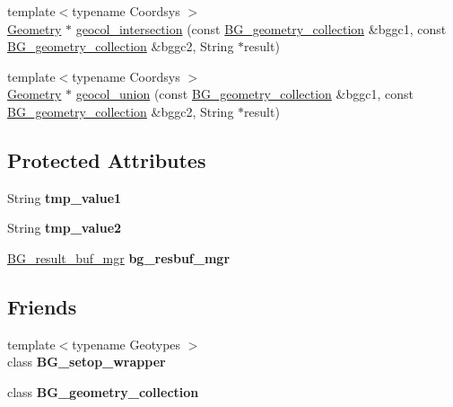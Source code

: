 \begin{DoxyCompactItemize}
\item 
{\footnotesize template$<$typename Coordsys $>$ }\\\mbox{\hyperlink{classGeometry}{Geometry}} $\ast$ \mbox{\hyperlink{classItem__func__spatial__operation_abf688dc5305ee501e952523d5131207d}{geocol\+\_\+intersection}} (const \mbox{\hyperlink{classBG__geometry__collection}{B\+G\+\_\+geometry\+\_\+collection}} \&bggc1, const \mbox{\hyperlink{classBG__geometry__collection}{B\+G\+\_\+geometry\+\_\+collection}} \&bggc2, String $\ast$result)
\item 
{\footnotesize template$<$typename Coordsys $>$ }\\\mbox{\hyperlink{classGeometry}{Geometry}} $\ast$ \mbox{\hyperlink{classItem__func__spatial__operation_a9827ef61e810b39f28574cc670bfb7b3}{geocol\+\_\+union}} (const \mbox{\hyperlink{classBG__geometry__collection}{B\+G\+\_\+geometry\+\_\+collection}} \&bggc1, const \mbox{\hyperlink{classBG__geometry__collection}{B\+G\+\_\+geometry\+\_\+collection}} \&bggc2, String $\ast$result)
\end{DoxyCompactItemize}
\subsection*{Protected Attributes}
\begin{DoxyCompactItemize}
\item 
\mbox{\label{classItem__func__spatial__operation_a8ad87a8857db93077d7e90f5d2ad685e}} 
String {\bfseries tmp\+\_\+value1}
\item 
\mbox{\label{classItem__func__spatial__operation_a0ce19ac6d0e6b828f093de4e6e98e665}} 
String {\bfseries tmp\+\_\+value2}
\item 
\mbox{\label{classItem__func__spatial__operation_a38aab305ffaa5ae8e33e1ceceb5828f8}} 
\mbox{\hyperlink{classBG__result__buf__mgr}{B\+G\+\_\+result\+\_\+buf\+\_\+mgr}} {\bfseries bg\+\_\+resbuf\+\_\+mgr}
\end{DoxyCompactItemize}
\subsection*{Friends}
\begin{DoxyCompactItemize}
\item 
\mbox{\label{classItem__func__spatial__operation_aac0e170e3397dfc0e3a75f575c17cba5}} 
{\footnotesize template$<$typename Geotypes $>$ }\\class {\bfseries B\+G\+\_\+setop\+\_\+wrapper}
\item 
\mbox{\label{classItem__func__spatial__operation_a032d9506339ef50d02218b7a9d98fd04}} 
class {\bfseries B\+G\+\_\+geometry\+\_\+collection}
\end{DoxyCompactItemize}
